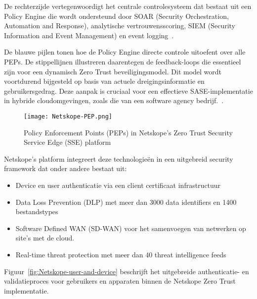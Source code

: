 \vspace{2ex}

De rechterzijde vertegenwoordigt het centrale controlesysteem dat bestaat uit een Policy Engine die wordt ondersteund door SOAR (Security Orchestration, Automation and Response), analytische vertrouwensscoring, SIEM (Security Information and Event Management) en event logging~\autocite{Netskope2024}. 

\vspace{2ex}

De blauwe pijlen tonen hoe de Policy Engine directe controle uitoefent over alle PEPs. De stippellijnen illustreren daarentegen de feedback-loops die essentieel zijn voor een dynamisch Zero Trust beveiligingsmodel. Dit model wordt voortdurend bijgesteld op basis van actuele dreigingsinformatie en gebruikersgedrag. Deze aanpak is cruciaal voor een effectieve SASE-implementatie in hybride cloudomgevingen, zoals die van een software agency bedrijf.~\autocite{Netskope2024}.
\begin{figure}[H]
  \centering
  \texttt{[image: Netskope-PEP.png]}
  \caption[Netskope Policy Enforcement Points (PEPs)]{Policy Enforcement Points (PEPs) in Netskope's Zero Trust Security Service Edge (SSE) platform~\autocite{Netskope2024}}
  \label{fig:Netskope-PEP}
\end{figure}


Netskope's platform integreert deze technologieën in een uitgebreid security framework dat onder andere bestaat uit:

\begin{itemize}
  \item Device en user authenticatie via een client certificaat infrastructuur
  \item Data Loss Prevention (DLP) met meer dan 3000 data identifiers en 1400 bestandstypes
  \item Software Defined WAN (SD-WAN) voor het samenvoegen van netwerken op site's met de cloud.
  \item Real-time threat protection met meer dan 40 threat intelligence feeds
\end{itemize}

Figuur~\ref{fig:Netskope-user-and-device} beschrijft het uitgebreide authenticatie- en validatieproces voor gebruikers en apparaten binnen de Netskope Zero Trust implementatie. 

\vspace{2ex}

